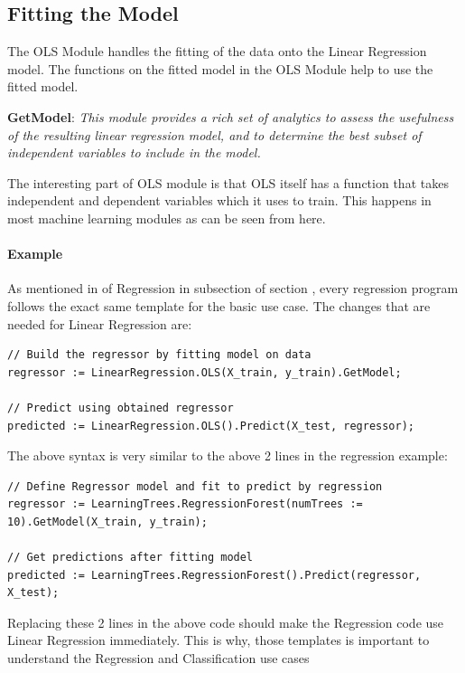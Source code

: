 \subsection{Fitting the Model}

The OLS Module handles the fitting of the data onto the Linear Regression model. The functions on the fitted model in the OLS Module help to use the fitted model. 

\textbf{GetModel}: \textit{This module provides a rich set of analytics to assess the usefulness of the resulting linear regression model, and to determine the best subset of independent variables to include in the model.}

The interesting part of OLS module is that OLS itself has a function that takes independent and dependent variables which it uses to train. This happens in most machine learning modules as can be seen from here.

\paragraph{Example}

As mentioned in  of Regression in  subsection of section , every regression program follows the exact same template for the basic use case. The changes that are needed for Linear Regression are:

\begin{lstlisting}
// Build the regressor by fitting model on data
regressor := LinearRegression.OLS(X_train, y_train).GetModel;

// Predict using obtained regressor
predicted := LinearRegression.OLS().Predict(X_test, regressor);
\end{lstlisting}

The above syntax is very similar to the above 2 lines in the regression example:

\begin{lstlisting}
// Define Regressor model and fit to predict by regression
regressor := LearningTrees.RegressionForest(numTrees := 10).GetModel(X_train, y_train);

// Get predictions after fitting model
predicted := LearningTrees.RegressionForest().Predict(regressor, X_test);
\end{lstlisting}

Replacing these 2 lines in the above code should make the Regression code use Linear Regression immediately. This is why, those templates is important to understand the Regression and Classification use cases

